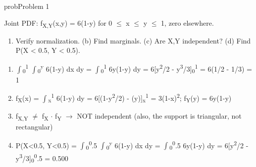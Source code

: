 \begin{PSbox}[unbreakable]{prob}{Problem 1}

Joint PDF: f\textsubscript{X,Y}(x,y) = 6(1-y) for 0 \ensuremath{\le} x \ensuremath{\le} y \ensuremath{\le} 1, zero elsewhere.

\begin{enumerate}
\def\labelenumi{(\alph{enumi})}
\tightlist
\item
  Verify normalization. (b) Find marginals. (c) Are X,Y independent? (d) Find P(X \textless{} 0.5, Y \textless{} 0.5).
\end{enumerate}

\PSsolution{} 

\begin{enumerate}
\def\labelenumi{(\alph{enumi})}
\tightlist
\item
  \ensuremath{\int}\textsubscript{0}\textsuperscript{1} \ensuremath{\int}\textsubscript{0}\textsuperscript{y} 6(1-y) dx dy = \ensuremath{\int}\textsubscript{0}\textsuperscript{1} 6y(1-y) dy = 6[y\textsuperscript{2}/2 - y\textsuperscript{3}/3]\textsubscript{0}\textsuperscript{1} = 6(1/2 - 1/3) = 1 \PSyes{}
\item
  f\textsubscript{X}(x) = \ensuremath{\int}\textsubscript{x}\textsuperscript{1} 6(1-y) dy = 6[(1-y\textsuperscript{2}/2) - (y)]\textsubscript{x}\textsuperscript{1} = 3(1-x)\textsuperscript{2}; f\textsubscript{Y}(y) = 6y(1-y)
\item
  f\textsubscript{X,Y} \ensuremath{\neq} f\textsubscript{X} \ensuremath{\cdot} f\textsubscript{Y} \ensuremath{\to} NOT independent (also, the support is triangular, not rectangular)
\item
  P(X\textless{}0.5, Y\textless{}0.5) = \ensuremath{\int}\textsubscript{0}\textsuperscript{0}.5 \ensuremath{\int}\textsubscript{0}\textsuperscript{y} 6(1-y) dx dy = \ensuremath{\int}\textsubscript{0}\textsuperscript{0}.5 6y(1-y) dy = 6[y\textsuperscript{2}/2 - y\textsuperscript{3}/3]\textsubscript{0}\textsuperscript{0}.5 = 0.500
\end{enumerate}

\end{PSbox}

